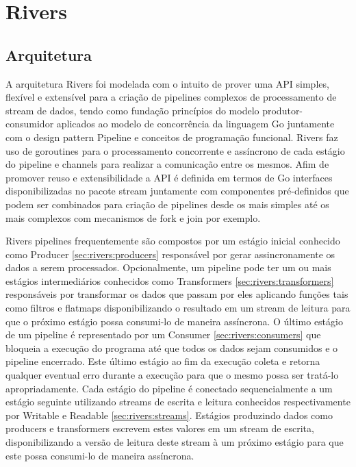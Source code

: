 \chapter{Rivers}
\label{cha:rivers}

\section{Arquitetura}
\label{sec:rivers:architecture}

A arquitetura Rivers foi modelada com o intuito de prover uma API simples, flexível e extensível para a criação de pipelines complexos de processamento de stream de dados, tendo como fundação princípios do modelo produtor-consumidor aplicados ao modelo de concorrência da linguagem Go juntamente com o design pattern Pipeline e conceitos de programação funcional. Rivers faz uso de goroutines para o processamento concorrente e assíncrono de cada estágio do pipeline e channels para realizar a comunicação entre os mesmos. Afim de promover reuso e extensibilidade a API é definida em termos de Go interfaces disponibilizadas no pacote stream juntamente com componentes pré-definidos que podem ser combinados para criação de pipelines desde os mais simples até os mais complexos com mecanismos de fork e join por exemplo.

Rivers pipelines frequentemente são compostos por um estágio inicial conhecido como Producer \ref{sec:rivers:producers} responsável por gerar assincronamente os dados a serem processados. Opcionalmente, um pipeline pode ter um ou mais estágios intermediários conhecidos como Transformers \ref{sec:rivers:transformers} responsáveis por transformar os dados que passam por eles aplicando funções tais como filtros e flatmaps disponibilizando o resultado em um stream de leitura para que o próximo estágio possa consumi-lo de maneira assíncrona. O último estágio de um pipeline é representado por um Consumer \ref{sec:rivers:consumers} que bloqueia a execução do programa até que todos os dados sejam consumidos e o pipeline encerrado. Este último estágio ao fim da execução coleta e retorna qualquer eventual erro durante a execução para que o mesmo possa ser tratá-lo apropriadamente. Cada estágio do pipeline é conectado sequencialmente a um estágio seguinte utilizando streams de escrita e leitura conhecidos respectivamente por Writable e Readable \ref{sec:rivers:streams}. Estágios produzindo dados como producers e transformers escrevem estes valores em um stream de escrita, disponibilizando a versão de leitura deste stream à um próximo estágio para que este possa consumi-lo de maneira assíncrona.


